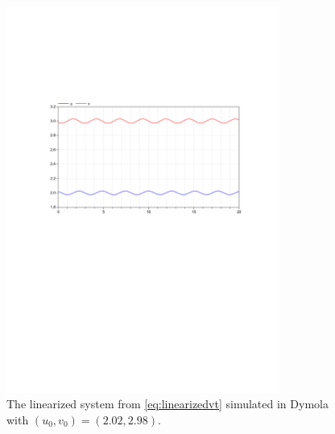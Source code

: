 \documentclass{article}
\begin{document}
\begin{figure}[H]
    \centering
    \includegraphics[width = 0.8\textwidth]{ex6_1c_202_298}
    \caption{The linearized system from \ref{eq:linearizedvt} simulated in Dymola with $(u_0,v_0) = (2.02,2.98)$.}
    \label{fig:1c_202_298}
\end{figure}
\end{document}
